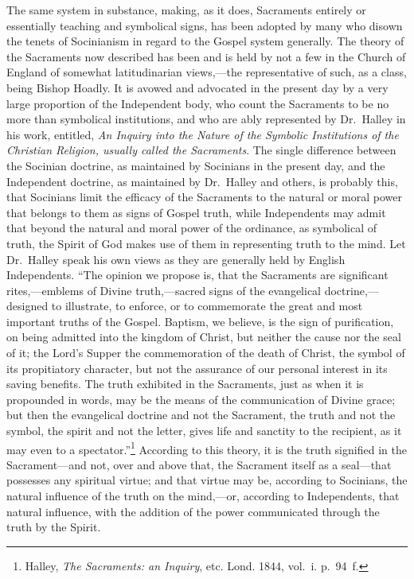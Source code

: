 \documentclass[
  english,
]{book}
\begin{document}
The same system in substance, making, as it does, Sacraments entirely or essentially teaching and symbolical signs, has been adopted by many who disown the tenets of Socinianism in regard to the Gospel system generally. The theory of the Sacraments now described has been and is held by not a few in the Church of England of somewhat latitudinarian views,---the representative of such, as a class, being Bishop Hoadly. It is avowed and advocated in the present day by a very large proportion of the Independent body, who count the Sacraments to be no more than symbolical institutions, and who are ably represented by Dr.~Halley in his work, entitled, \emph{An Inquiry into the Nature of the Symbolic Institutions of the Christian Religion, usually called the Sacraments}. The single difference between the Socinian doctrine, as maintained by Socinians in the present day, and the Independent doctrine, as maintained by Dr.~Halley and others, is probably this, that Socinians limit the efficacy of the Sacraments to the natural or moral power that belongs to them as signs of Gospel truth, while Independents may admit that beyond the natural and moral power of the ordinance, as symbolical of truth, the Spirit of God makes use of them in representing truth to the mind. Let Dr.~Halley speak his own views as they are generally held by English Independents. ``The opinion we propose is, that the Sacraments are significant rites,---emblems of Divine truth,---sacred signs of the evangelical doctrine,---designed to illustrate, to enforce, or to commemorate the great and most important truths of the Gospel. Baptism, we believe, is the sign of purification, on being admitted into the kingdom of Christ, but neither the cause nor the seal of it; the Lord's Supper the commemoration of the death of Christ, the symbol of its propitiatory character, but not the assurance of our personal interest in its saving benefits. The truth exhibited in the Sacraments, just as when it is propounded in words, may be the means of the communication of Divine grace; but then the evangelical doctrine and not the Sacrament, the truth and not the symbol, the spirit and not the letter, gives life and sanctity to the recipient, as it may even to a spectator.''\footnote{Halley, \emph{The Sacraments: an Inquiry}, etc. Lond. 1844, vol.~i. p.~94~f.} According to this theory, it is the truth signified in the Sacrament---and not, over and above that, the Sacrament itself as a seal---that possesses any spiritual virtue; and that virtue may be, according to Socinians, the natural influence of the truth on the mind,---or, according to Independents, that natural influence, with the addition of the power communicated through the truth by the Spirit.
\end{document}

